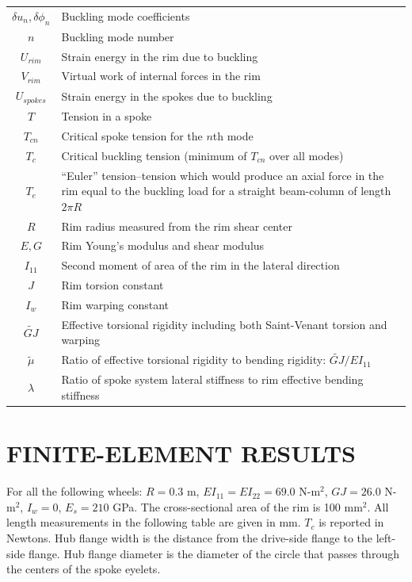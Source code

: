 \documentclass{bmd2016p}
\begin{document}
\begin{table}[ht!]
\begin{tabular}{c|p{12cm}}
$\delta u_n, \delta\phi_n$ & Buckling mode coefficients\\
$n$			& Buckling mode number\\
$U_{rim}$	& Strain energy in the rim due to buckling\\
$V_{rim}$	& Virtual work of internal forces in the rim\\
$U_{spokes}$& Strain energy in the spokes due to buckling\\
$T$			& Tension in a spoke\\
$T_{cn}$	& Critical spoke tension for the $n$th mode\\
$T_c$		& Critical buckling tension (minimum of $T_{cn}$ over all modes)\\
$T_e$		& ``Euler'' tension--tension which would produce an axial force in the rim
			  equal to the buckling load for a straight beam-column of length $2\pi R$\\
$R$			& Rim radius measured from the rim shear center\\
$E, G$		& Rim Young's modulus and shear modulus\\
$I_{11}$	& Second moment of area of the rim in the lateral direction\\
$J$			& Rim torsion constant\\
$I_w$		& Rim warping constant\\
$\widetilde{GJ}$ & Effective torsional rigidity including both Saint-Venant torsion and warping\\
$\tilde{\mu}$ & Ratio of effective torsional rigidity to bending rigidity: $\widetilde{GJ}/EI_{11}$\\
$\lambda$	& Ratio of spoke system lateral stiffness to rim effective bending stiffness \\
\hline
\end{tabular}
\end{table}


\newpage
\section*{FINITE-ELEMENT RESULTS}
For all the following wheels: $R=0.3$ m, $EI_{11}=EI_{22}=69.0$ N-m$^2$, $GJ=26.0$ N-m$^2$, $I_w=0$, $E_s=210$ GPa. The cross-sectional area of the rim is 100 mm$^2$. All length measurements in the following table are given in mm. $T_c$ is reported in Newtons. Hub flange width is the distance from the drive-side flange to the left-side flange. Hub flange diameter is the diameter of the circle that passes through the centers of the spoke eyelets.
\end{document}
